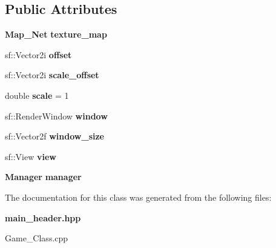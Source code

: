 \subsection*{Public Attributes}
\begin{DoxyCompactItemize}
\item 
\mbox{\label{class_game_a7f7bcbfabe1f934a35b4b2ebb07ab081}} 
\textbf{ Map\+\_\+\+Net} {\bfseries texture\+\_\+map}
\item 
\mbox{\label{class_game_a793d916f26e5b18585a924f0b04d3d29}} 
sf\+::\+Vector2i {\bfseries offset}
\item 
\mbox{\label{class_game_a8692b6957cee6766cb8dea1120e26b52}} 
sf\+::\+Vector2i {\bfseries scale\+\_\+offset}
\item 
\mbox{\label{class_game_aabe9e45119ae00b3b11cff84e10d15ae}} 
double {\bfseries scale} = 1
\item 
\mbox{\label{class_game_a223de215aeb661cd423ac145756cc730}} 
sf\+::\+Render\+Window {\bfseries window}
\item 
\mbox{\label{class_game_ac136054a272ae71ed3697acc58ee13a0}} 
sf\+::\+Vector2f {\bfseries window\+\_\+size}
\item 
\mbox{\label{class_game_a72739bdd7a7159a83394be25d7e116d6}} 
sf\+::\+View {\bfseries view}
\item 
\mbox{\label{class_game_afaa30a69a82e00c28792bb472b8dd8d9}} 
\textbf{ Manager} {\bfseries manager}
\end{DoxyCompactItemize}


The documentation for this class was generated from the following files\+:\begin{DoxyCompactItemize}
\item 
\textbf{ main\+\_\+header.\+hpp}\item 
Game\+\_\+\+Class.\+cpp\end{DoxyCompactItemize}
